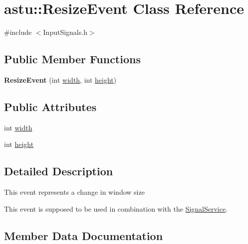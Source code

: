 \hypertarget{classastu_1_1ResizeEvent}{}\section{astu\+:\+:Resize\+Event Class Reference}
\label{classastu_1_1ResizeEvent}


{\ttfamily \#include $<$Input\+Signals.\+h$>$}

\subsection*{Public Member Functions}
\begin{DoxyCompactItemize}
\item 
\mbox{\label{classastu_1_1ResizeEvent_a97cb125f182f595d162b40ac9cb20215}} 
{\bfseries Resize\+Event} (int \hyperlink{classastu_1_1ResizeEvent_a66a7c2ec2a1a3bc9ac7cdbe1caf64800}{width}, int \hyperlink{classastu_1_1ResizeEvent_a62c7cbf013ac2a425765e7230e6b8d0f}{height})
\end{DoxyCompactItemize}
\subsection*{Public Attributes}
\begin{DoxyCompactItemize}
\item 
int \hyperlink{classastu_1_1ResizeEvent_a66a7c2ec2a1a3bc9ac7cdbe1caf64800}{width}
\item 
int \hyperlink{classastu_1_1ResizeEvent_a62c7cbf013ac2a425765e7230e6b8d0f}{height}
\end{DoxyCompactItemize}


\subsection{Detailed Description}
This event represents a change in window size

This event is supposed to be used in combination with the \hyperlink{classastu_1_1SignalService}{Signal\+Service}. 

\subsection{Member Data Documentation}
\mbox{\label{classastu_1_1ResizeEvent_a62c7cbf013ac2a425765e7230e6b8d0f}} 

